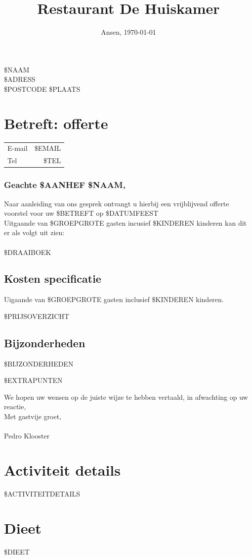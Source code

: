\documentclass{scrartcl}
\begin{document}

\title{Restaurant De Huiskamer}
\date{Ansen, \today}
\maketitle
\thispagestyle{empty}

\begin{flushright}
	\$NAAM \\
	\$ADRESS \\
	\$POSTCODE \$PLAATS
\end{flushright}
\section{Betreft: offerte}
\begin{tabular}{l r}
  E-mail & \$EMAIL  \\
  Tel & \$TEL  \\
\end{tabular}

\subsubsection*{Geachte \$AANHEF \$NAAM,}

Naar aanleiding van ons gesprek ontvangt u hierbij een vrijblijvend offerte voorstel
voor uw \$BETREFT op \$DATUMFEEST \\

Uitgaande van \$GROEPGROTE gasten incusief \$KINDEREN kinderen kan dit er als volgt uit zien: \\\\
\$DRAAIBOEK

\newpage

\subsection*{Kosten specificatie}
Uigaande van \$GROEPGROTE gasten inclusief \$KINDEREN kinderen.

\$PRIJSOVERZICHT

\subsection*{Bijzonderheden}

\$BIJZONDERHEDEN

\$EXTRAPUNTEN

We hopen uw wensen op de juiste wijze te hebben vertaald, in afwachting op uw reactie, \\

Met gastvije groet, \\\\

Pedro Klooster

\newpage

\section{Activiteit details}

\$ACTIVITEITDETAILS

\section{Dieet}

\$DIEET
\end{document}
